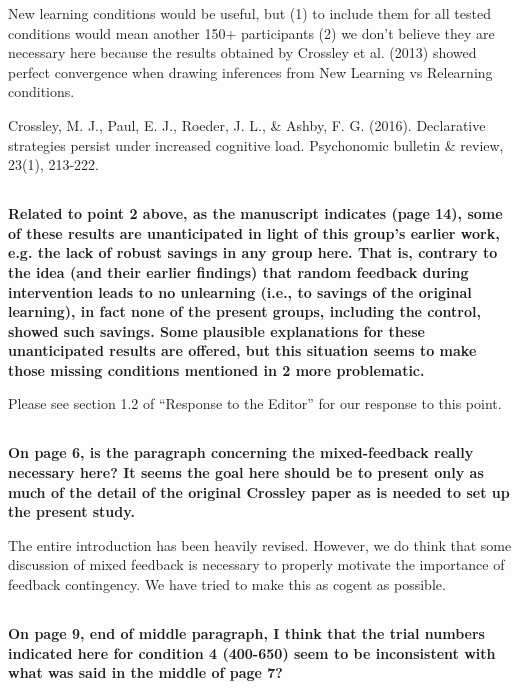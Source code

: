 \documentclass[10pt,a4paper]{article} \usepackage{amsmath} \usepackage{parskip}
\begin{document}
New learning conditions would be useful, but (1) to include them for all tested
conditions would mean another 150+ participants (2) we don't believe they are
necessary here because the results obtained by Crossley et al. (2013) showed
perfect convergence when drawing inferences from New Learning vs Relearning
conditions.

Crossley, M. J., Paul, E. J., Roeder, J. L., \& Ashby, F. G. (2016). Declarative
strategies persist under increased cognitive load. Psychonomic bulletin \&
review, 23(1), 213-222.

\subsection{} \textbf{
  Related to point 2 above, as the manuscript indicates (page 14), some of these
  results are unanticipated in light of this group's earlier work, e.g. the lack
  of robust savings in any group here. That is, contrary to the idea (and their
  earlier findings) that random feedback during intervention leads to no
  unlearning (i.e., to savings of the original learning), in fact none of the
  present groups, including the control, showed such savings. Some plausible
  explanations for these unanticipated results are offered, but this situation
  seems to make those missing conditions mentioned in 2 more problematic.
}

Please see section 1.2 of ``Response to the Editor'' for our response to this
point.

\subsection{} \textbf{
  On page 6, is the paragraph concerning the mixed-feedback really necessary here?
  It seems the goal here should be to present only as much of the detail of the
  original Crossley paper as is needed to set up the present study.
}

The entire introduction has been heavily revised. However, we do think that some
discussion of mixed feedback is necessary to properly motivate the importance of
feedback contingency. We have tried to make this as cogent as possible.

\subsection{} \textbf{
  On page 9, end of middle paragraph, I think that the trial numbers indicated
  here for condition 4 (400-650) seem to be inconsistent with what was said in the
  middle of page 7?
}
\end{document}
